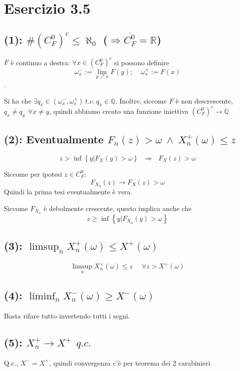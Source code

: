 \documentclass{article}
\begin{document}
\section{Esercizio 3.5}
\subsection{(1): $\#\left(C_F^0\right)^c \leq  \aleph_0$  ($\Rightarrow \overline{C_F^0} = \mathbb{R}$)}
$F$ è continuo a destra: $\forall x\in (C_F^0)^c$ si possono definire $$\omega_x^- := \lim_{y \nearrow x} F(y); \ \ \ \ \ \omega _x^+ := F(x)$$.

Si ha che $\exists q_x \in  (\omega _x^-, \omega _x^+) \ t.c.\ q_x\in \mathbb{Q}$. Inoltre, siccome $F$ è non descrescente, $q_x \neq  q_y\ \  \forall x\neq y$, quindi abbiamo creato una funzione iniettiva $(C_F^0)^c \longrightarrow \mathbb{Q}$

\subsection{(2): Eventualmente $F_n(z)>\omega \ \land \ X_n^+(\omega )\leq z$}
\[
	z > \inf\left\{y | F_X(y) > \omega \right\} \ \ \ \Longrightarrow \ \ \ F_X(z) > \omega 
\]

Siccome per ipotesi $z \in  C_F^0$:
\[
	F_{X_n} \left(z\right) \longrightarrow  F_X(z) > \omega 
\]
Quindi la prima tesi eventualmente è vera.

Siccome $F_{X_n}$ è debolmente crescente, questo implica anche che
\[
	z \geq  \inf\left\{y | F_{X_n}(y) > \omega \right\}
\]

\subsection{(3): $\limsup_n X_n^+(\omega ) \leq  X^+(\omega )$}
\[
	\limsup_n X_n^+(\omega ) \leq z\ \ \ \ \ \ \forall  z> X^+(\omega )
\]

\subsection{(4): $\liminf_n X_n^-(\omega ) \geq  X^-(\omega )$}
Basta rifare tutto invertendo tutti i segni.

\subsection{(5): $X_n^+ \rightarrow  X^+ \ \ q.c.$}
Q.c., $X^- = X^+$, quindi convergenza c'è per teorema dei 2 carabinieri.
\end{document}
